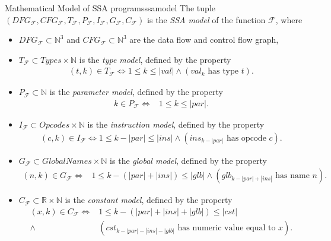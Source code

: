 \begin{definition}{Mathematical Model of SSA programs}{ssamodel}
    The tuple     $
        (DFG_\mathcal{F},
         CFG_\mathcal{F},
         T_\mathcal{F},
         P_\mathcal{F},
         I_\mathcal{F},
         G_\mathcal{F},
         C_\mathcal{F})
    $
    is the {\em SSA model} of the function $\mathcal F$, where
    \begin{itemize}
    \item $DFG_\mathcal{F}\subset\mathbb N^3$ and
          $CFG_\mathcal{F}\subset\mathbb N^3$ are the data flow and control
          flow graph,
    \item $T_\mathcal F\subset Types\times\mathbb N$ is the {\it type model},
          defined by the property
          \begin{align*}
              (t,k)\in T_\mathcal F\iff 1\leq k\leq |val|
                  \mathrel{\land}(val_k\text{ has type }t).
          \end{align*}
    \item $P_\mathcal F\subset\mathbb N$ is the {\it parameter model}, defined
          by the property
          \begin{align*}
              k\in P_\mathcal F\iff&1\leq k\leq|par|.
          \end{align*}
    \item $I_\mathcal F\subset Opcodes\times \mathbb N$ is the
          {\it instruction model}, defined by the property
          \begin{align*}
              (c,k)\in I_\mathcal F\iff1\leq k-|par|\leq|ins|
                  \mathrel{\land}(ins_{k-|par|}\text{ has opcode }c).
          \end{align*}
    \item $G_\mathcal F\subset GlobalNames\times\mathbb N$ is the
          {\it global model}, defined by the property
          \begin{align*}
              (n,k)\in G_\mathcal F\iff&1\leq k-(|par|+|ins|)\leq|glb|
                  \mathrel{\land}(glb_{k-|par|+|ins|}\text{ has name }n).
          \end{align*}
    \item $C_\mathcal F\subset\mathbb R\times\mathbb N$ is the
          {\it constant model}, defined by the property
          \begin{align*}
              (x,k)\in C_\mathcal F\iff{}&1\leq k-(|par|+|ins|+|glb|)\leq |cst|\\
                        \mathrel{\land}{}&(cst_{k-|par|-|ins|-|glb|}
                        \text{ has numeric value equal to }x).
          \end{align*}
    \end{itemize}
\end{definition}

